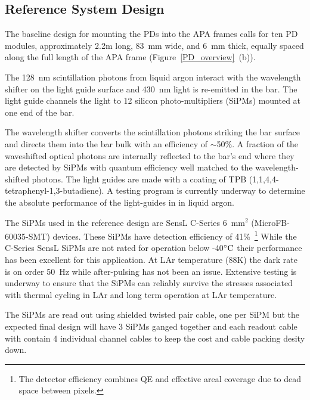 \subsection{Reference System Design}
\label{sec:detectors-fd-ref-pd-refsystem}   %

The baseline design for mounting the PDs into the APA frames calls for
ten PD modules, approximately 2.2m long, 83~mm wide, and 6~mm thick,
equally spaced along the full length of the APA frame
(Figure~\ref{PD_overview}~(b)). 

The 128~nm scintillation photons from liquid argon interact with the
wavelength shifter on the light guide surface and 430~nm light is
re-emitted in the bar. The light guide channels the light to
12 silicon photo-multipliers (SiPMs) mounted at one end of the bar.

The wavelength shifter converts the scintillation photons striking the
bar surface and directs them into the bar bulk with an efficiency of
$\sim$50\%.  A fraction of the waveshifted optical photons are
internally reflected to the bar's end where they are detected by SiPMs
with quantum efficiency well matched to the wavelength-shifted
photons. The light guides are made with a coating of TPB
(1,1,4,4-tetraphenyl-1,3-butadiene). A testing program is currently
underway to determine the absolute performance of the light-guides in
in liquid argon.

The SiPMs used in the reference design are SensL C-Series 6~mm$^2$
(MicroFB-60035-SMT) devices. These SiPMs have detection efficiency of
41\%~\footnote{The detector efficiency combines QE and effective areal
  coverage due to dead space between pixels.} While the C-Series SensL
SiPMs are not rated for operation below -40$^{\circ}{\rm C}$ their
performance has been excellent for this application. At LAr
temperature (88K) the dark rate is on order 50~Hz while after-pulsing
has not been an issue. Extensive testing is underway to ensure that
the SiPMs can reliably survive the stresses associated with thermal
cycling in LAr and long term operation at LAr temperature.

The SiPMs are read out using shielded twisted pair cable, one per SiPM
but the expected final design will have 3 SiPMs ganged together and
each readout cable with contain 4 individual channel cables to keep
the cost and cable packing desity down.  


